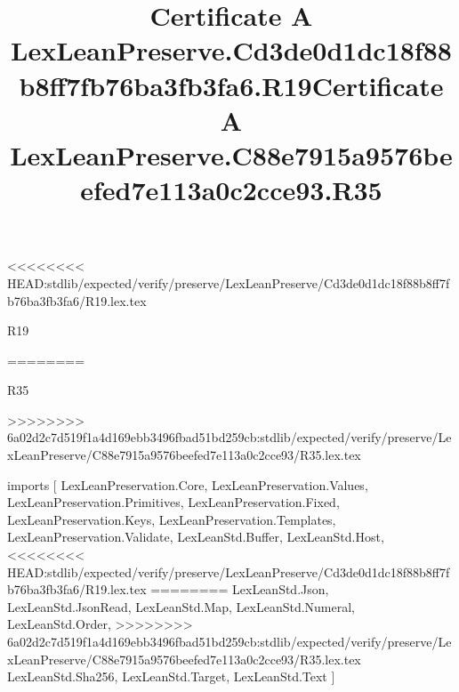 <<<<<<<< HEAD:stdlib/expected/verify/preserve/LexLeanPreserve/Cd3de0d1dc18f88b8ff7fb76ba3fb3fa6/R19.lex.tex
\begin{lexlean}{R19}
\title{Certificate A LexLeanPreserve.Cd3de0d1dc18f88b8ff7fb76ba3fb3fa6.R19}
========
\begin{lexlean}{R35}
\title{Certificate A LexLeanPreserve.C88e7915a9576beefed7e113a0c2cce93.R35}
>>>>>>>> 6a02d2c7d519f1a4d169ebb3496fbad51bd259cb:stdlib/expected/verify/preserve/LexLeanPreserve/C88e7915a9576beefed7e113a0c2cce93/R35.lex.tex
\begin{coremodule}
imports [
  LexLeanPreservation.Core,
  LexLeanPreservation.Values,
  LexLeanPreservation.Primitives,
  LexLeanPreservation.Fixed,
  LexLeanPreservation.Keys,
  LexLeanPreservation.Templates,
  LexLeanPreservation.Validate,
  LexLeanStd.Buffer,
  LexLeanStd.Host,
<<<<<<<< HEAD:stdlib/expected/verify/preserve/LexLeanPreserve/Cd3de0d1dc18f88b8ff7fb76ba3fb3fa6/R19.lex.tex
========
  LexLeanStd.Json,
  LexLeanStd.JsonRead,
  LexLeanStd.Map,
  LexLeanStd.Numeral,
  LexLeanStd.Order,
>>>>>>>> 6a02d2c7d519f1a4d169ebb3496fbad51bd259cb:stdlib/expected/verify/preserve/LexLeanPreserve/C88e7915a9576beefed7e113a0c2cce93/R35.lex.tex
  LexLeanStd.Sha256,
  LexLeanStd.Target,
  LexLeanStd.Text
]


\end{coremodule}
\end{lexlean}
\end{lexlean}
